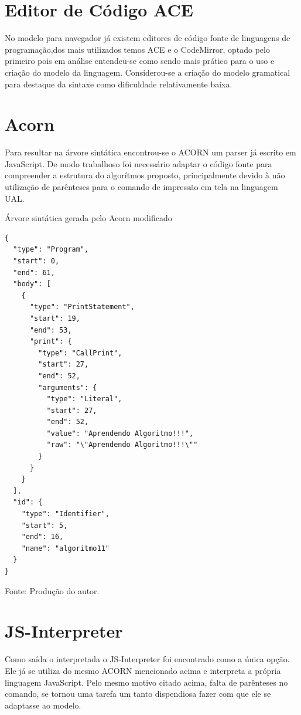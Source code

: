 \section{Editor de Código ACE}

No modelo para navegador já existem editores de código fonte de linguagens de programação,dos mais utilizados temos ACE\nocite{ace} e o CodeMirror\nocite{codemirror}, optado pelo primeiro pois em análise entendeu-se como sendo mais prático para o uso e criação do modelo da linguagem. Considerou-se a criação do modelo gramatical para destaque da sintaxe como dificuldade relativamente baixa.

\section{Acorn}

Para resultar na árvore sintática encontrou-se o ACORN\nocite{acorn} um parser já escrito em JavaScript. De modo trabalhoso foi necessário adaptar o código fonte para compreender a estrutura do algorítmos proposto, principalmente devido à não utilização de parênteses para o comando de impressão em tela na linguagem UAL.

\begin{quadro}[h]
\centering
  \caption{Árvore sintática gerada pelo Acorn modificado}\label{qua:compare-tools}
\begin{lstlisting}[style=json,frame=single]
{
  "type": "Program",
  "start": 0,
  "end": 61,
  "body": [
    {
      "type": "PrintStatement",
      "start": 19,
      "end": 53,
      "print": {
        "type": "CallPrint",
        "start": 27,
        "end": 52,
        "arguments": {
          "type": "Literal",
          "start": 27,
          "end": 52,
          "value": "Aprendendo Algoritmo!!!",
          "raw": "\"Aprendendo Algoritmo!!!\""
        }
      }
    }
  ],
  "id": {
    "type": "Identifier",
    "start": 5,
    "end": 16,
    "name": "algoritmo11"
  }
}
\end{lstlisting}
  \caption*{\ifdraft{\color{green}}{}\footnotesize Fonte: Produção do autor.}
\end{quadro}

\section{JS-Interpreter}

Como saída o interpretada o JS-Interpreter\nocite{jsinterpreter} foi encontrado como a única opção. Ele já se utiliza do mesmo ACORN mencionado acima e interpreta a própria linguagem JavaScript. Pelo mesmo motivo citado acima, falta de parênteses no comando, se tornou uma tarefa um tanto dispendiosa fazer com que ele se adaptasse ao modelo.

